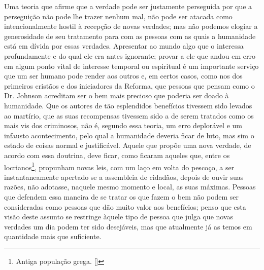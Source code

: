 Uma teoria que afirme que a verdade pode ser justamente perseguida
por que a perseguição não pode lhe trazer nenhum mal, não pode ser
atacada como intencionalmente hostil à recepção de novas
verdades; mas não podemos elogiar a generosidade de seu tratamento para
com as pessoas com as quais a humanidade está em dívida por essas
verdades. Apresentar ao mundo algo que o interessa profundamente e do
qual ele era antes ignorante; provar a ele que andou em erro em algum
ponto vital de interesse temporal ou espiritual é um
importante serviço que um ser humano pode render aos outros
e, em certos casos, como nos dos primeiros cristãos e dos iniciadores da
Reforma, que pessoas que pensam como o Dr. Johnson acreditam ser o bem
mais precioso que poderia ser doado à humanidade. Que os autores de tão
esplendidos benefícios tivessem sido levados ao martírio, que as suas
recompensas tivessem sido a de serem tratados como os mais vis dos
criminosos, não é, segundo essa teoria, um erro deplorável e um infausto
acontecimento, pelo qual a humanidade deveria ficar de luto, mas sim o
estado de coisas normal e justificável. Aquele que propõe uma nova
verdade, de acordo com essa doutrina, deve ficar, como ficaram aqueles
que, entre os locrianos\footnote{ Antiga população grega. []}, 
propunham novas leis, com um laço em volta do   
pescoço, a ser instantaneamente apertado se a assembleia de cidadãos,
depois de ouvir suas razões, não adotasse, naquele mesmo momento e
local, as suas máximas. Pessoas que defendem essa maneira de se tratar
os que fazem o bem não podem ser consideradas como pessoas que dão muito valor aos
benefícios; penso que esta visão deste assunto se restringe àquele
tipo de pessoa que julga que novas verdades um dia podem ter sido
desejáveis, mas que atualmente já as temos em quantidade mais que suficiente. 

